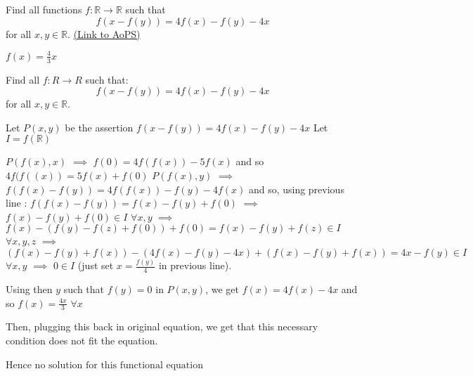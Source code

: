 \begin{problem}
	Find all functions $f: \mathbb R \to \mathbb R$ such that
\[ f(x - f(y)) = 4f(x) - f(y) - 4x\] for all $ x,y \in \mathbb{R}.$
	\flushright \href{https://artofproblemsolving.com/community/c6h317348}{(Link to AoPS)}
\end{problem}



\begin{solution}
	$ f(x)=\frac{4}{3}x$
\end{solution}



\begin{solution}
	\begin{tcolorbox}Find all $ f: R\rightarrow R$ such that:
\[ f(x - f(y)) = 4f(x) - f(y) - 4x\]
for all $ x,y \in \mathbb{R}.$\end{tcolorbox}

Let $ P(x,y)$ be the assertion $ f(x - f(y)) = 4f(x) - f(y) - 4x$
Let $ I = f(\mathbb R)$

$ P(f(x),x)$ $ \implies$ $ f(0) = 4f(f(x)) - 5f(x)$ and so $ 4f(f((x)) = 5f(x) + f(0)$
$ P(f(x),y)$ $ \implies$ $ f(f(x) - f(y)) = 4f(f(x)) - f(y) - 4f(x)$ and so, using previous line : $ f(f(x) - f(y)) = f(x) - f(y) + f(0)$
$ \implies$ $ f(x) - f(y) + f(0)\in I$ $ \forall x,y$
$ \implies$ $ f(x) - (f(y) - f(z) + f(0)) + f(0) = f(x) - f(y) + f(z)\in I$ $ \forall x,y,z$
$ \implies$ $ (f(x) - f(y) + f(x)) - (4f(x) - f(y) - 4x) + (f(x) - f(y) + f(x)) = 4x - f(y)\in I$ $ \forall x,y$
$ \implies$ $ 0\in I$ (just set $ x = \frac {f(y)}4$ in previous line).

Using then $ y$ such that $ f(y) = 0$ in $ P(x,y)$, we get $ f(x) = 4f(x) - 4x$ and so $ f(x) = \frac {4x}3$ $ \forall x$

Then, plugging this back in original equation, we get that this necessary condition does not fit the equation.

Hence $ \boxed{\text{no solution for this functional equation}}$
\end{solution}




